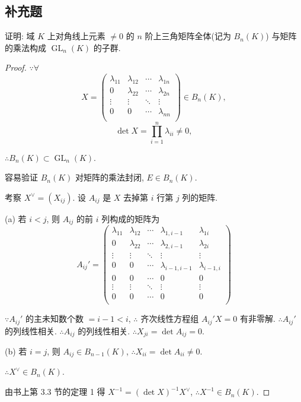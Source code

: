 \documentclass{ctexart}
\begin{document}
\subsection{补充题}
\begin{exercise}[补充题 1]
    证明: 域 $K$ 上对角线上元素 $\neq0$ 的 $n$ 阶上三角矩阵全体(记为 $B_n(K)$) 与矩阵的乘法构成 $\operatorname{GL}_n(K)$ 的子群.
\end{exercise}
\begin{proof}
    $\because\forall$
    \[X=\begin{pmatrix}
        \lambda_{11} & \lambda_{12} & \cdots & \lambda_{1n} \\
        0 & \lambda_{22} & \cdots & \lambda_{2n} \\
        \vdots & \vdots & \ddots & \vdots \\
        0 & 0 & \cdots & \lambda_{nn} \\
    \end{pmatrix}\in B_n(K),\]
    \[\det X=\prod\limits_{i=1}^n\lambda_{ii}\neq0,\]

    $\therefore B_n(K)\subset\operatorname{GL}_n(K)$.

    容易验证 $B_n(K)$ 对矩阵的乘法封闭, $E\in B_n(K)$.

    考察 $X^\vee=(X_{ij})$. 设 $A_{ij}$ 是 $X$ 去掉第 $i$ 行第 $j$ 列的矩阵.
    
    (a) 若 $i<j$, 则 $A_{ij}$ 的前 $i$ 列构成的矩阵为
    \[A_{ij}'=\begin{pmatrix}
        \lambda_{11} & \lambda_{12} & \cdots & \lambda_{1,i-1} & \lambda_{1i} \\
        0 & \lambda_{22} & \cdots & \lambda_{2,i-1} & \lambda_{2i} \\
        \vdots & \vdots & \ddots & \vdots & \vdots \\
        0 & 0 & \cdots & \lambda_{i-1,i-1} & \lambda_{i-1,i} \\
        0 & 0 & \cdots & 0 & 0 \\
        \vdots & \vdots & \ddots & \vdots & \vdots \\
        0 & 0 & \cdots & 0 & 0 \\
    \end{pmatrix}\]

    $\because A_{ij}'$ 的主未知数个数 $=i-1<i$, $\therefore$ 齐次线性方程组 $A_{ij}'X=0$ 有非零解. $\therefore A_{ij}'$ 的列线性相关. $\therefore A_{ij}$ 的列线性相关. $\therefore X_{ji}=\det A_{ij}=0$.

    (b) 若 $i=j$, 则 $A_{ij}\in B_{n-1}(K)$, $\therefore X_{ii}=\det A_{ii}\neq0$.
    
    $\therefore X^\vee\in B_n(K)$.

    由书上第 3.3 节的定理 1 得 $X^{-1}=(\det X)^{-1}X^\vee$, $\therefore X^{-1}\in B_n(K)$.
\end{proof}
\end{document}

